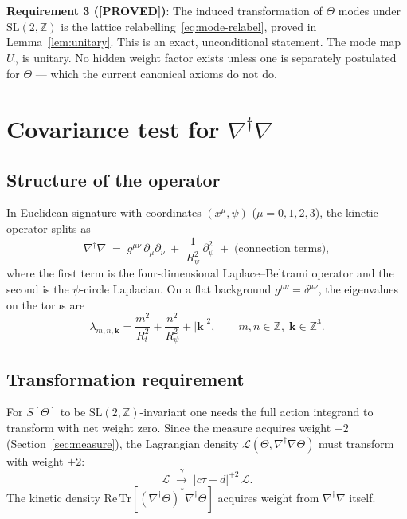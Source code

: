 \documentclass[12pt,a4paper]{article}
\theoremstyle{definition}
\theoremstyle{remark}
\newcommand{\PROVED}{\textcolor{green!50!black}{\textbf{[PROVED]}}}
\newcommand{\SL}{\mathrm{SL}}
\newcommand{\ZZ}{\mathbb{Z}}
\newcommand{\Tr}{\mathrm{Tr}}
\newcommand{\Real}{\mathrm{Re}}
\begin{document}
\begin{resultbox}
\textbf{Requirement 3 (\PROVED)}: The induced transformation of $\Theta$ modes
under $\SL(2,\ZZ)$ is the lattice relabelling~\eqref{eq:mode-relabel},
proved in Lemma~\ref{lem:unitary}.  This is an exact, unconditional
statement.  The mode map $U_\gamma$ is unitary.  No hidden weight factor
exists unless one is separately postulated for $\Theta$ — which the current
canonical axioms do not do.
\end{resultbox}

\section{Covariance test for $\nabla^\dagger\nabla$}
\label{sec:operator}

\subsection{Structure of the operator}

In Euclidean signature with coordinates $(x^\mu,\psi)$ ($\mu=0,1,2,3$),
the kinetic operator splits as
\begin{equation}
  \nabla^\dagger\nabla
  \;=\;
  g^{\mu\nu}\,\partial_\mu\partial_\nu
  \;+\;
  \frac{1}{R_\psi^2}\,\partial_\psi^2
  \;+\;
  \text{(connection terms)},
  \label{eq:operator-split}
\end{equation}
where the first term is the four-dimensional Laplace–Beltrami operator and
the second is the $\psi$-circle Laplacian.  On a flat background
$g^{\mu\nu}=\delta^{\mu\nu}$, the eigenvalues on the torus are
\begin{equation}
  \lambda_{m,n,\mathbf k}
  = \frac{m^2}{R_t^2} + \frac{n^2}{R_\psi^2} + |\mathbf k|^2,
  \qquad m,n\in\ZZ,\;\mathbf k\in\ZZ^3.
  \label{eq:eigenvalues}
\end{equation}

\subsection{Transformation requirement}

For $S[\Theta]$ to be $\SL(2,\ZZ)$-invariant one needs the full action
integrand to transform with net weight zero.  Since the measure acquires
weight $-2$ (Section~\ref{sec:measure}), the Lagrangian density
$\mathcal L(\Theta,\nabla^\dagger\nabla\Theta)$ must transform with
weight $+2$:
\begin{equation}
  \mathcal L \;\xrightarrow{\gamma}\; |c\tau+d|^{+2}\,\mathcal L.
  \label{eq:Lag-weight-required}
\end{equation}
The kinetic density $\Real\,\Tr[(\nabla^\dagger\Theta)^\ast\nabla^\dagger\Theta]$
acquires weight from $\nabla^\dagger\nabla$ itself.
\end{document}
